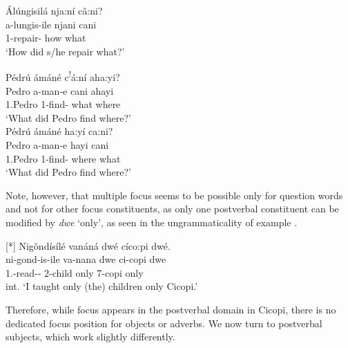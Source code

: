 \documentclass[output=paper]{langscibook}
\begin{document}

\ex
Álúngisilá nja:ní câ:ni?\\
\gll
a-lungis-ile  njani  cani\\
1\SM{}-repair-\PFV{}  how  what\\
\glt
‘How did s/he repair what?’\\


\z
\z

\ea\label{bkm:Ref141356920}
\ea
Pédrú ámáné c\textsuperscript{!}á:ní aha:yi?\\
\gll
Pedro  a-man-e  cani  ahayi\\
1.Pedro  1\SM{}-find-\PFV{}  what  where\\
\glt
‘What did Pedro find where?’\\


\ex
Pédrú ámáné ha:yí ca:ni?\\
\gll
Pedro  a-man-e  hayi  cani\\
1.Pedro  1\SM{}-find-\PFV{}  where  what\\
\glt
‘What did Pedro find where?’\\

\z
\z

Note, however, that multiple focus seems to be possible only for question words and not for other focus constituents, as only one postverbal constituent can be modified by \textit{dwe} ‘only’, as seen in the ungrammaticality of example .

\ea
[*]{
\label{bkm:Ref124149352}
Nigǒndísílé vanáná dwé cíco:pi dwé.\\
\gll
ni-gond-is-ile  va-nana  dwe  ci-copi  dwe\\
1\SG.\SM{}-read-\CAUS{}-\PFV{}  2-child  only  7-copi  only\\
\glt
int. ‘I taught only (the) children only Cicopi.’\\
}

\z

Therefore, while focus appears in the postverbal domain in Cicopi, there is no dedicated focus position for objects or adverbs. We now turn to postverbal subjects, which work slightly differently.
\end{document}
